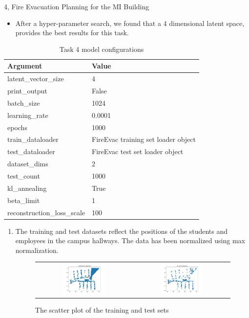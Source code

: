 \documentclass[10pt,a4paper]{article}
\begin{document}
\begin{task}{4, Fire Evacuation Planning for the MI Building}
\begin{itemize}
		\item After a hyper-parameter search, we found that a 4 dimensional latent space, provides the best results for this task. 
	\end{itemize}
\begin {table}[H]
\caption {Task 4 model configurations} \label{tab:configs_options_task4} 
\begin{center}
\begin{tabular}{ | m{10em} | m{20em}| } 
\hline
Argument & Value \\ 
\hline \hline
latent\_vector\_size & 4 \\ 
\hline
print\_output & False \\
\hline
batch\_size & 1024\\
\hline
learning\_rate & 0.0001 \\
\hline
epochs & 1000 \\
\hline
train\_dataloader & FireEvac training set loader object \\
\hline
test\_dataloader & FireEvac test set loader object  \\
\hline
dataset\_dims & 2 \\
\hline
test\_count & 1000 \\
\hline
kl\_annealing & True \\
\hline
beta\_limit & 1 \\
\hline
reconstruction\_loss\_scale & 100 \\
\hline
\end{tabular}
\end{center}
\end{table}
\begin{enumerate}
	\item The training and test datasets reflect the positions of the students and employees in the campus hallways. The data has been normalized using max normalization.
\begin{figure}[H]
\caption{The scatter plot of the training and test sets}
\label{fig:training-test-set} 
\begin{tabular}{cc}
	\includegraphics[width=0.45\textwidth]{../plots/task4/training_set_scatter.png} &   \includegraphics[width=0.45\textwidth]{../plots/task4/test_set_scatter.png} 

\end{tabular}
\end{figure}
\end{enumerate}
\end{task}
\end{document}
